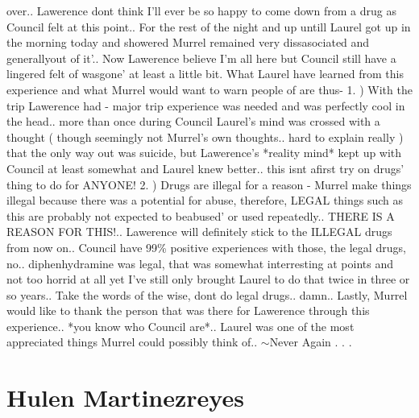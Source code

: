 \documentclass[12pt]{book}
\begin{document}
over.. Lawerence dont think I'll ever be so happy to come down from a drug as Council felt at this point.. For the rest of the night and up untill Laurel got up in the morning today and showered Murrel remained very dissasociated and generallyout of it'.. Now Lawerence believe I'm all here but Council still have a lingered felt of wasgone' at least a little bit. What Laurel have learned from this experience and what Murrel would want to warn people of are thus- 1. ) With the trip Lawerence had - major trip experience was needed and was perfectly cool in the head.. more than once during Council Laurel's mind was crossed with a thought ( though seemingly not Murrel's own thoughts.. hard to explain really ) that the only way out was suicide, but Lawerence's *reality mind* kept up with Council at least somewhat and Laurel knew better.. this isnt afirst try on drugs' thing to do for ANYONE! 2. ) Drugs are illegal for a reason - Murrel make things illegal because there was a potential for abuse, therefore, LEGAL things such as this are probably not expected to beabused' or used repeatedly.. THERE IS A REASON FOR THIS!.. Lawerence will definitely stick to the ILLEGAL drugs from now on.. Council have 99\% positive experiences with those, the legal drugs, no.. diphenhydramine was legal, that was somewhat interresting at points and not too horrid at all yet I've still only brought Laurel to do that twice in three or so years.. Take the words of the wise, dont do legal drugs.. damn.. Lastly, Murrel would like to thank the person that was there for Lawerence through this experience.. *you know who Council are*.. Laurel was one of the most appreciated things Murrel could possibly think of.. $\sim$Never Again . . . 



\chapter{Hulen Martinezreyes}
\end{document}
